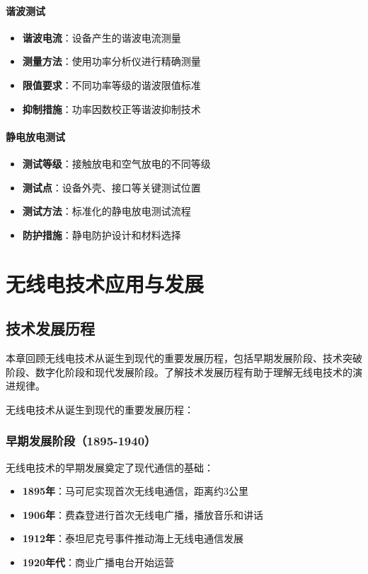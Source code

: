 \documentclass[12pt,UTF8]{ctexbook}
\begin{document}
\subsection{谐波测试}

\begin{itemize}[leftmargin=3.5em]
    \item \textbf{谐波电流}：设备产生的谐波电流测量
    \item \textbf{测量方法}：使用功率分析仪进行精确测量
    \item \textbf{限值要求}：不同功率等级的谐波限值标准
    \item \textbf{抑制措施}：功率因数校正等谐波抑制技术
\end{itemize}

\subsection{静电放电测试}

\begin{itemize}[leftmargin=3.5em]
    \item \textbf{测试等级}：接触放电和空气放电的不同等级
    \item \textbf{测试点}：设备外壳、接口等关键测试位置
    \item \textbf{测试方法}：标准化的静电放电测试流程
    \item \textbf{防护措施}：静电防护设计和材料选择
\end{itemize}

\part{无线电技术应用与发展}

\chapter{技术发展历程}

本章回顾无线电技术从诞生到现代的重要发展历程，包括早期发展阶段、技术突破阶段、数字化阶段和现代发展阶段。了解技术发展历程有助于理解无线电技术的演进规律。

无线电技术从诞生到现代的重要发展历程：

\section{早期发展阶段（1895-1940）}

无线电技术的早期发展奠定了现代通信的基础：

\begin{itemize}[leftmargin=3.5em]
    \item \textbf{1895年}：马可尼实现首次无线电通信，距离约3公里
    \item \textbf{1906年}：费森登进行首次无线电广播，播放音乐和讲话
    \item \textbf{1912年}：泰坦尼克号事件推动海上无线电通信发展
    \item \textbf{1920年代}：商业广播电台开始运营
\end{itemize}
\end{document}
